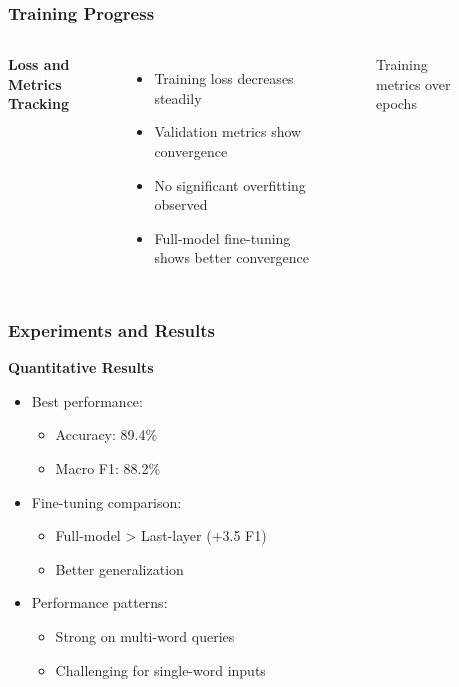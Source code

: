 \documentclass{beamer}
\begin{document}
\begin{frame}
\frametitle{Training Progress}
\begin{columns}
  \textbf{Loss and Metrics Tracking}
  \begin{itemize}
    \item Training loss decreases steadily
    \item Validation metrics show convergence
    \item No significant overfitting observed
    \item Full-model fine-tuning shows better convergence
  \end{itemize}

  \begin{figure}
    \caption{Training metrics over epochs}
  \end{figure}
\end{columns}
\end{frame}

\begin{frame}
\frametitle{Experiments and Results}
\textbf{Quantitative Results}
\begin{itemize}
  \item Best performance:
  \begin{itemize}
    \item Accuracy: 89.4\%
    \item Macro F1: 88.2\%
  \end{itemize}
  \item Fine-tuning comparison:
  \begin{itemize}
    \item Full-model > Last-layer (+3.5 F1)
    \item Better generalization
  \end{itemize}
  \item Performance patterns:
  \begin{itemize}
    \item Strong on multi-word queries
    \item Challenging for single-word inputs
  \end{itemize}
\end{itemize}
\end{frame}
\end{document}
